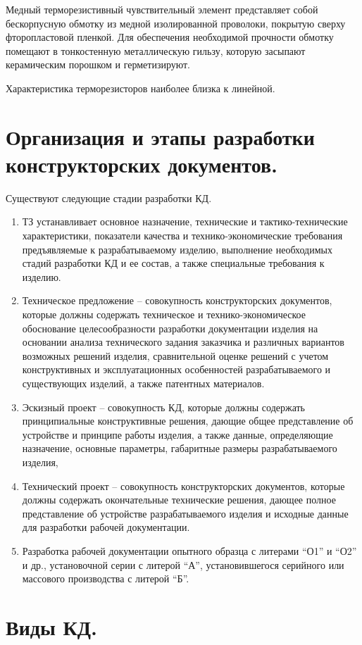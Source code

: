 \documentclass[unicode, 12pt, a4paper, oneside]{article}
\begin{document}
Медный терморезистивный чувствительный элемент представляет собой бескорпусную обмотку из медной изолированной проволоки, покрытую сверху фторопластовой пленкой. Для обеспечения необходимой прочности обмотку помещают в тонкостенную металлическую гильзу, которую засыпают керамическим порошком и герметизируют.

Характеристика терморезисторов наиболее близка к линейной.

\section{Организация и этапы разработки конструкторских документов.}

Существуют следующие стадии разработки КД.
\begin{enumerate}
\item ТЗ устанавливает основное назначение, технические и тактико-технические характеристики, показатели качества и технико-экономические требования предъявляемые к разрабатываемому изделию, выполнение необходимых стадий разработки КД и ее состав, а также специальные требования к изделию.
\item Техническое предложение – совокупность конструкторских документов, которые должны содержать техническое и технико-экономическое обоснование целесообразности разработки документации изделия на основании анализа технического задания заказчика и различных вариантов возможных решений изделия, сравнительной оценке решений с учетом конструктивных и эксплуатационных особенностей разрабатываемого и существующих изделий, а также патентных материалов.
\item Эскизный проект – совокупность КД, которые должны содержать принципиальные конструктивные решения, дающие общее представление об устройстве и принципе работы изделия, а также данные, определяющие назначение, основные  параметры, габаритные размеры разрабатываемого изделия, 
\item Технический проект – совокупность конструкторских документов, которые должны содержать окончательные технические решения, дающее полное представление об устройстве разрабатываемого изделия и исходные данные для разработки рабочей документации.
\item Разработка рабочей документации опытного образца с литерами “О1” и “О2” и др., установочной серии с литерой “А”, установившегося серийного или массового производства с литерой “Б”.
\end{enumerate}

\section{Виды КД.}
\end{document}
